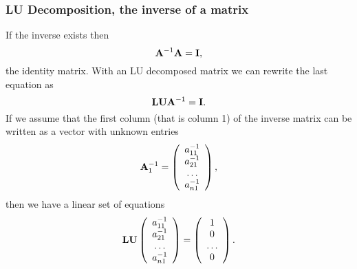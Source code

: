 \documentclass[compress]{beamer}
\begin{document}
\frame
{
  \frametitle{LU Decomposition, the inverse of a matrix}
\begin{small}
{\scriptsize
If the inverse exists
then
\[
   {\bf A}^{-1}{\bf A}={\bf I},
\]
the identity matrix. With an LU decomposed matrix we can rewrite the last equation as
\[
   {\bf LU}{\bf A}^{-1}={\bf I}.
\]
If we assume that the first column (that is column 1) of the inverse matrix
can be written as a vector with unknown entries
\[
    {\bf A}_1^{-1}= \left( \begin{array}{c}

                              a_{11}^{-1} \\
                              a_{21}^{-1} \\
                              \dots \\
                              a_{n1}^{-1} \\
                    \end{array} \right),
\]
then we have a linear set of equations
\[
    {\bf LU}\left( \begin{array}{c}

                              a_{11}^{-1} \\
                              a_{21}^{-1} \\
                              \dots \\
                              a_{n1}^{-1} \\
                    \end{array} \right) =\left( \begin{array}{c}
                               1 \\
                              0 \\
                              \dots \\
                              0 \\
                    \end{array} \right).
\]
}
\end{small}
}
\end{document}
